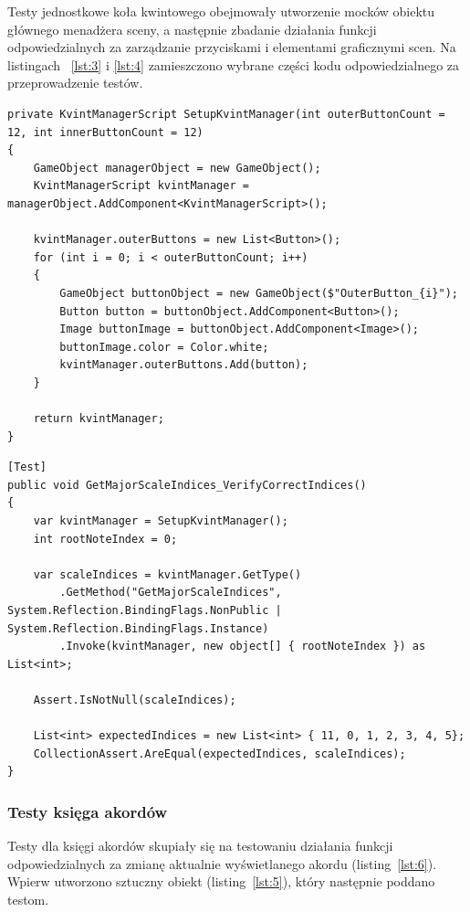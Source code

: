 Testy jednostkowe koła kwintowego obejmowały utworzenie mocków obiektu głównego menadżera sceny, a następnie zbadanie działania funkcji odpowiedzialnych za zarządzanie przyciskami i elementami graficznymi scen. Na listingach ~\ref{lst:3} i \ref{lst:4} zamieszczono wybrane części kodu odpowiedzialnego za przeprowadzenie testów.

\begin{lstlisting}[style=sharpcstyle,caption=Funkcja \texttt{SetupKvintManager}, label=lst:3]
private KvintManagerScript SetupKvintManager(int outerButtonCount = 12, int innerButtonCount = 12)
{
    GameObject managerObject = new GameObject();
    KvintManagerScript kvintManager = managerObject.AddComponent<KvintManagerScript>();
    
    kvintManager.outerButtons = new List<Button>();
    for (int i = 0; i < outerButtonCount; i++)
    {
        GameObject buttonObject = new GameObject($"OuterButton_{i}");
        Button button = buttonObject.AddComponent<Button>();
        Image buttonImage = buttonObject.AddComponent<Image>();
        buttonImage.color = Color.white;
        kvintManager.outerButtons.Add(button);
    }

    return kvintManager;
}  
\end{lstlisting}

\begin{lstlisting}[style=sharpcstyle,caption=Funkcja \texttt{GetMajorScaleIndices\_VerifyCorrectIndices}, label=lst:4]
[Test]
public void GetMajorScaleIndices_VerifyCorrectIndices()
{
    var kvintManager = SetupKvintManager();
    int rootNoteIndex = 0;

    var scaleIndices = kvintManager.GetType()
        .GetMethod("GetMajorScaleIndices", System.Reflection.BindingFlags.NonPublic | System.Reflection.BindingFlags.Instance)
        .Invoke(kvintManager, new object[] { rootNoteIndex }) as List<int>;

    Assert.IsNotNull(scaleIndices);
    
    List<int> expectedIndices = new List<int> { 11, 0, 1, 2, 3, 4, 5};
    CollectionAssert.AreEqual(expectedIndices, scaleIndices);
}
\end{lstlisting}

\subsubsection{Testy księga akordów}

Testy dla księgi akordów skupiały się na testowaniu działania funkcji odpowiedzialnych za zmianę aktualnie wyświetlanego akordu (listing~\ref{lst:6}). Wpierw utworzono sztuczny obiekt (listing~\ref{lst:5}), który następnie poddano testom.

